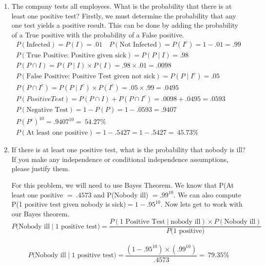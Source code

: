 \documentclass[12pt,twoside]{article}
\begin{document}
\begin{enumerate}
\begin{enumerate}
  \item  The company tests all employees. What is the probability that there is at least one positive test?
  Firstly, we must determine the probability that any one test yields a positive result. This can be done by adding the probability of a True positive with the probability of a False positive.
  \begin{equation}
      \begin{aligned}
P(\text{Infected}) = P(I) = .01 \quad P(\text{Not Infected}) = P(I^c) = 1-.01 = .99 \\ 
P(\text{True Positive: Positive given sick}) = P(P \mid I) = .98\\
          P(P \cap I) = P(P \mid I) \times P(I) = .98 \times .01 = .0098 \\
          P(\text{False Positive: Positive Test given not sick}) = P(P\mid I^c) = .05 \\
          P(P\cap I^c) = P(P\mid I^c) \times P(I^c) = .05 \times .99 = .0495\\
         P(Positive Test) = P(P\cap I) + P(P\cap I^c) = .0098 + .0495 = .0593\\
         P(\text{Negative Test}) = 1-P(P) = 1-.0593 = .9407 \\
         P(P^c)^{10} = .9407^{10} = ~54.27\% \\
         P(\text{At least one positive})= 1 - .5427 = 1 - .5427 = ~45.73\%
      \end{aligned}
  \end{equation}
  
  \item If there is at least one positive test, what is the probability that nobody is ill? If you make any independence or conditional independence assumptions, please justify them.

\subitem
For this problem, we will need to use Bayes Theorem. We know that P(At least one positive $= ~.4573$ and P(Nobody ill) $=.99^{10}$. We can also compute P(1 positive test given nobody is sick)$= 1-.95^{10}$. Now lets get to work with our Bayes theorem.\\

$$ P(\text{Nobody ill}\mid \text{1 positive test)} = \frac{P(\text{1 Positive Test} \mid \text{nobody ill}) \times P(\text{Nobody ill})}{P(\text{1 positive)}} $$ \\

$$ P(\text{Nobody ill}\mid \text{1 positive test)} = \frac{(1-.95^{10})\times (.99^{10})}{.4573} = ~79.35\% $$


\end{enumerate}
\end{enumerate}
\end{document}

